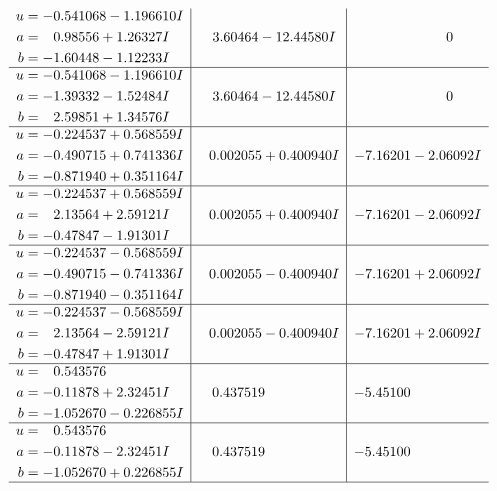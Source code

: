 \documentclass[1p]{elsarticle_modified}
\theoremstyle{definition}
\begin{document}
$$\begin{array}{c|c|c}
\begin{aligned}
u &= -0.541068 - 1.196610 I \\
a &= \phantom{-}0.98556 + 1.26327 I \\
b &= -1.60448 - 1.12233 I\end{aligned}
 & \phantom{-}3.60464 - 12.44580 I & \phantom{-0.000000 } 0 \\ \hline\begin{aligned}
u &= -0.541068 - 1.196610 I \\
a &= -1.39332 - 1.52484 I \\
b &= \phantom{-}2.59851 + 1.34576 I\end{aligned}
 & \phantom{-}3.60464 - 12.44580 I & \phantom{-0.000000 } 0 \\ \hline\begin{aligned}
u &= -0.224537 + 0.568559 I \\
a &= -0.490715 + 0.741336 I \\
b &= -0.871940 + 0.351164 I\end{aligned}
 & \phantom{-}0.002055 + 0.400940 I & -7.16201 - 2.06092 I \\ \hline\begin{aligned}
u &= -0.224537 + 0.568559 I \\
a &= \phantom{-}2.13564 + 2.59121 I \\
b &= -0.47847 - 1.91301 I\end{aligned}
 & \phantom{-}0.002055 + 0.400940 I & -7.16201 - 2.06092 I \\ \hline\begin{aligned}
u &= -0.224537 - 0.568559 I \\
a &= -0.490715 - 0.741336 I \\
b &= -0.871940 - 0.351164 I\end{aligned}
 & \phantom{-}0.002055 - 0.400940 I & -7.16201 + 2.06092 I \\ \hline\begin{aligned}
u &= -0.224537 - 0.568559 I \\
a &= \phantom{-}2.13564 - 2.59121 I \\
b &= -0.47847 + 1.91301 I\end{aligned}
 & \phantom{-}0.002055 - 0.400940 I & -7.16201 + 2.06092 I \\ \hline\begin{aligned}
u &= \phantom{-}0.543576\phantom{ +0.000000I} \\
a &= -0.11878 + 2.32451 I \\
b &= -1.052670 - 0.226855 I\end{aligned}
 & \phantom{-}0.437519\phantom{ +0.000000I} & -5.45100\phantom{ +0.000000I} \\ \hline\begin{aligned}
u &= \phantom{-}0.543576\phantom{ +0.000000I} \\
a &= -0.11878 - 2.32451 I \\
b &= -1.052670 + 0.226855 I\end{aligned}
 & \phantom{-}0.437519\phantom{ +0.000000I} & -5.45100\phantom{ +0.000000I}\\
 \hline 
 \end{array}$$\newpage\newpage\renewcommand{\arraystretch}{1}
\end{document}
